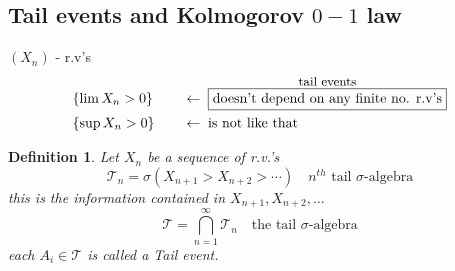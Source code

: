 \documentclass[12pt]{article}
\newtheorem{definition}{Definition}[section]
\begin{document}
\subsection{Tail events and Kolmogorov $0-1$ law}
$(X_n)$ - r.v's
\begin{alignat*}{2}
&\{\lim X_n >0\} &\quad &\leftarrow \; \overset{\text{\small tail events}}{\boxed{\text{doesn't depend on any finite no. r.v's}}}\\
&\{\sup X_n >0\} &\quad &\leftarrow \; \text{is not like that}
\end{alignat*}

\begin{definition}Let $X_n$ be a sequence of r.v.'s 
\[\mathcal{T}_n =\sigma(X_{n+1}>X_{n+2}> \cdots ) \quad \text{$n^{th}$ tail $\sigma$-algebra} \]
this is the information contained in $X_{n+1}, X_{n+2}, \dots$ 
\[\mathcal{T} = \bigcap_{n=1}^{\infty}\mathcal{T}_n  \quad \text{the tail $\sigma$-algebra} \]
each $A_i \in \mathcal{T}$ is called a Tail event.
\end{definition}
\end{document}
